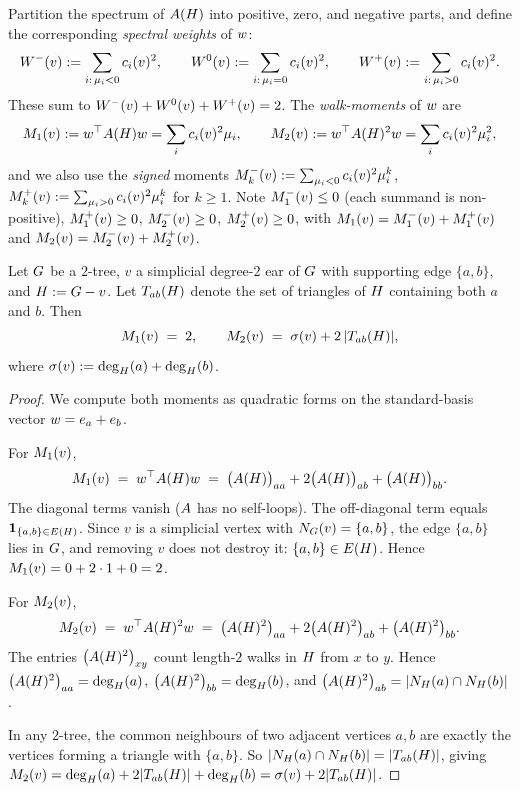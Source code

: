 Partition the spectrum of $A(H)$ into positive, zero, and
negative parts, and define the corresponding \emph{spectral weights} of
$w$:
\[
W^{-}(v) := \sum_{i:\, \mu_{i} < 0} c_{i}(v)^{2},
\qquad
W^{0}(v) := \sum_{i:\, \mu_{i} = 0} c_{i}(v)^{2},
\qquad
W^{+}(v) := \sum_{i:\, \mu_{i} > 0} c_{i}(v)^{2}.
\]
These sum to $W^{-}(v) + W^{0}(v) + W^{+}(v) = 2$. The \emph{walk-moments}
of $w$ are
\[
M_{1}(v) := w^{\top} A(H) w = \sum_{i} c_{i}(v)^{2} \mu_{i},
\qquad
M_{2}(v) := w^{\top} A(H)^{2} w = \sum_{i} c_{i}(v)^{2} \mu_{i}^{2},
\]
and we also use the \emph{signed} moments
$M_{k}^{-}(v) := \sum_{\mu_{i} < 0} c_{i}(v)^{2} \mu_{i}^{k}$,
$M_{k}^{+}(v) := \sum_{\mu_{i} > 0} c_{i}(v)^{2} \mu_{i}^{k}$ for
$k \ge 1$. Note $M_{1}^{-}(v) \le 0$ (each summand is non-positive),
$M_{1}^{+}(v) \ge 0$, $M_{2}^{-}(v) \ge 0$, $M_{2}^{+}(v) \ge 0$, with
$M_{1}(v) = M_{1}^{-}(v) + M_{1}^{+}(v)$ and
$M_{2}(v) = M_{2}^{-}(v) + M_{2}^{+}(v)$.

\begin{lemma}\label{lem:walk-moments}
Let $G$ be a $2$-tree, $v$ a simplicial degree-$2$ ear of $G$
with supporting edge $\{a, b\}$, and $H := G - v$. Let
$T_{ab}(H)$ denote the set of triangles of $H$ containing
both $a$ and $b$. Then
\[
M_{1}(v) \;=\; 2,
\qquad
M_{2}(v) \;=\; \sigma(v) + 2 \, |T_{ab}(H)|,
\]
where $\sigma(v) := \deg_{H}(a) + \deg_{H}(b)$.
\end{lemma}

\begin{proof}
We compute both moments as quadratic forms on the standard-basis vector
$w = e_{a} + e_{b}$.

For $M_{1}(v)$,
\[
M_{1}(v) \;=\; w^{\top} A(H) w
\;=\; \bigl(A(H)\bigr)_{aa} + 2 \bigl(A(H)\bigr)_{ab}
+ \bigl(A(H)\bigr)_{bb}.
\]
The diagonal terms vanish ($A$ has no self-loops). The off-diagonal
term equals $\mathbf{1}_{\{a, b\} \in E(H)}$. Since $v$ is a
simplicial vertex with $N_{G}(v) = \{a, b\}$, the edge $\{a, b\}$
lies in $G$, and removing $v$ does not destroy it: $\{a, b\}
\in E(H)$. Hence $M_{1}(v) = 0 + 2 \cdot 1 + 0 = 2$.

For $M_{2}(v)$,
\[
M_{2}(v) \;=\; w^{\top} A(H)^{2} w
\;=\; \bigl(A(H)^{2}\bigr)_{aa}
+ 2 \bigl(A(H)^{2}\bigr)_{ab}
+ \bigl(A(H)^{2}\bigr)_{bb}.
\]
The entries $\bigl(A(H)^{2}\bigr)_{xy}$ count length-$2$ walks
in $H$ from $x$ to $y$. Hence
$\bigl(A(H)^{2}\bigr)_{aa} = \deg_{H}(a)$,
$\bigl(A(H)^{2}\bigr)_{bb} = \deg_{H}(b)$, and
$\bigl(A(H)^{2}\bigr)_{ab} = |N_{H}(a) \cap N_{H}(b)|$.

In any $2$-tree, the common neighbours of two adjacent vertices $a, b$
are exactly the vertices forming a triangle with $\{a, b\}$. So
$|N_{H}(a) \cap N_{H}(b)| = |T_{ab}(H)|$, giving
$M_{2}(v) = \deg_{H}(a) + 2 |T_{ab}(H)| + \deg_{H}(b)
= \sigma(v) + 2 |T_{ab}(H)|$.
\end{proof}

